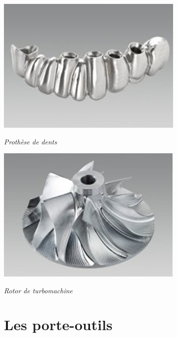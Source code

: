 \documentclass[11pt,oneside]{article}
\begin{document}
\begin{minipage}[c]{.24\linewidth}
\begin{center}
\includegraphics[width=.95\textwidth]{png/ex_3}

\textit{Prothèse de dents}
\end{center}
\end{minipage}\hfill
\begin{minipage}[c]{.24\linewidth}
\begin{center}
\includegraphics[width=.95\textwidth]{png/ex_4}

\textit{Rotor de turbomachine}
\end{center}
\end{minipage}

\section{Les porte-outils}
\end{document}
